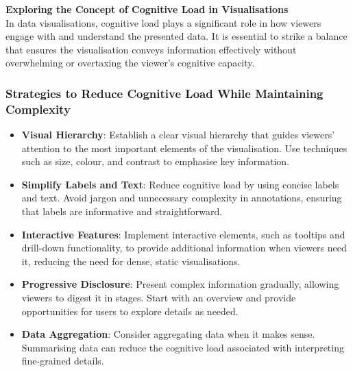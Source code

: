 \documentclass{article}\usepackage[]{graphicx}\usepackage[]{xcolor}
\begin{document}
\textbf{Exploring the Concept of Cognitive Load in Visualisations}\\
In data visualisations, cognitive load plays a significant role in how viewers engage with and understand the presented data. It is essential to strike a balance that ensures the visualisation conveys information effectively without overwhelming or overtaxing the viewer's cognitive capacity.

\subsubsection{Strategies to Reduce Cognitive Load While Maintaining Complexity}
\begin{itemize}
    \item \textbf{Visual Hierarchy}: Establish a clear visual hierarchy that guides viewers' attention to the most important elements of the visualisation. Use techniques such as size, colour, and contrast to emphasise key information.
    \item \textbf{Simplify Labels and Text}: Reduce cognitive load by using concise labels and text. Avoid jargon and unnecessary complexity in annotations, ensuring that labels are informative and straightforward.
    \item \textbf{Interactive Features}: Implement interactive elements, such as tooltips and drill-down functionality, to provide additional information when viewers need it, reducing the need for dense, static visualisations.
    \item \textbf{Progressive Disclosure}: Present complex information gradually, allowing viewers to digest it in stages. Start with an overview and provide opportunities for users to explore details as needed.
    \item \textbf{Data Aggregation}: Consider aggregating data when it makes sense. Summarising data can reduce the cognitive load associated with interpreting fine-grained details.
\end{itemize}
\end{document}
